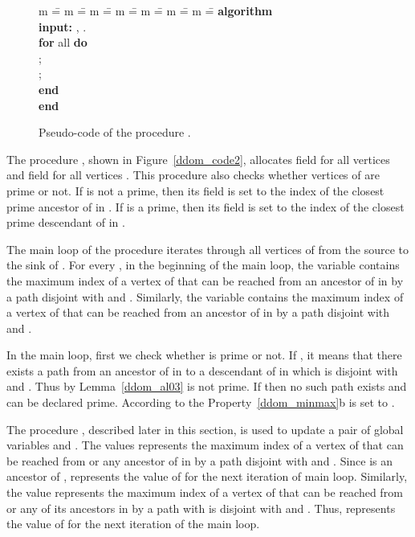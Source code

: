 \documentclass{llncs}
\newcommand{\ALGORITHM}{\textbf{algorithm} }
\newcommand{\END}{\textbf{end} }
\newcommand{\DO}{\textbf{do} }
\newcommand{\FOR}{\textbf{for} }
\newcommand{\INPUT}{\textbf{input:} }
\begin{document}
\begin{figure}[t!]
\begin{center}
\parbox{0cm} 
{
\begin{tabbing}
m \== m \== m \== m \== m \== m \== m \== \kill
\ALGORITHM  \\
\INPUT , .\\
\> \FOR all  \DO \\
\> \> ;\\
\> \> ;\\
\> \END \\
\END
\end{tabbing}
}
\caption{Pseudo-code of the procedure .}\label{ddom_code4}
\end{center}
\end{figure}

The procedure , shown in Figure~\ref{ddom_code2},  
allocates  field
for all vertices  and  field for all vertices . This procedure also checks whether vertices of  are
prime or not.  If  is not a prime, then its field  is set
to the index of the closest prime ancestor of  in .
If  is a prime, then its field  is set
to the index of the closest prime descendant of  in .

The main loop of the procedure 
iterates through all vertices  of  from the source to
the sink of . For every , in the beginning of the main loop, the
variable  contains the maximum index of a vertex of
 that can be reached from an ancestor of  in  by
a path disjoint with  and . Similarly, the variable  contains the
maximum index of a vertex of  that can be reached from
an ancestor of  in  by a path disjoint with  and .

In the main loop, first we check whether  is prime or not. 
If , it means that there exists a
path  from an ancestor of  in  to a 
descendant of  in  which is disjoint with  and . Thus by Lemma~\ref{ddom_al03}  is not
prime. If  then no such path
exists and  can be declared prime. According to the
Property~\ref{ddom_minmax}b  is set to .

The procedure
, described later in this section, is used to update a pair
of global variables  and . The
values  represents the maximum index of a vertex of
 that can be reached from  or any ancestor of  in  
by a path disjoint with  and . Since  is an ancestor of
,  represents the value of
 for the next iteration of main loop. Similarly, the value
 represents the maximum index of a vertex of 
that can be reached from  or any of its ancestors in  by a
path with is disjoint with  and . Thus,  represents the value of
 for the next iteration of the main loop.
\end{document}
